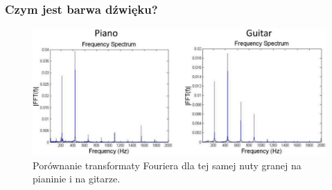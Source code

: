 \documentclass[]{beamer}
\begin{document}
\begin{frame}
  \frametitle{Czym jest \textbf{barwa} dźwięku?}
  \begin{figure}
    \centering
    \includegraphics[width=0.9\linewidth]{piano_guitar_fourier.png}
    \caption{Porównanie transformaty Fouriera dla tej samej nuty granej na pianinie i na gitarze.}
  \end{figure}
\end{frame}


\end{document}
